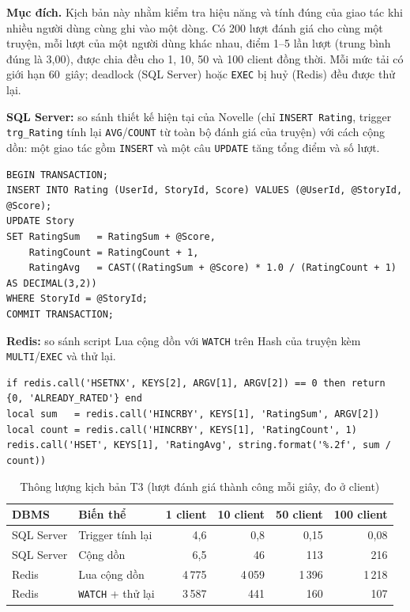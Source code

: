 \textbf{Mục đích.} Kịch bản này nhằm kiểm tra hiệu năng và tính đúng của giao tác khi nhiều người dùng cùng ghi vào một dòng. Có 200 lượt đánh giá cho cùng một truyện, mỗi lượt của một người dùng khác nhau, điểm 1--5 lần lượt (trung bình đúng là 3,00), được chia đều cho 1, 10, 50 và 100 client đồng thời. Mỗi mức tải có giới hạn 60~giây; deadlock (SQL Server) hoặc \texttt{EXEC} bị huỷ (Redis) đều được thử lại.

\textbf{SQL Server:} so sánh thiết kế hiện tại của Novelle (chỉ \texttt{INSERT Rating}, trigger \texttt{trg\_Rating} tính lại \texttt{AVG}/\texttt{COUNT} từ toàn bộ đánh giá của truyện) với cách cộng dồn: một giao tác gồm \texttt{INSERT} và một câu \texttt{UPDATE} tăng tổng điểm và số lượt.

\begin{verbatim}
BEGIN TRANSACTION;
INSERT INTO Rating (UserId, StoryId, Score) VALUES (@UserId, @StoryId, @Score);
UPDATE Story
SET RatingSum   = RatingSum + @Score,
    RatingCount = RatingCount + 1,
    RatingAvg   = CAST((RatingSum + @Score) * 1.0 / (RatingCount + 1) AS DECIMAL(3,2))
WHERE StoryId = @StoryId;
COMMIT TRANSACTION;
\end{verbatim}

\textbf{Redis:} so sánh script Lua cộng dồn với \texttt{WATCH} trên Hash của truyện kèm \texttt{MULTI}/\texttt{EXEC} và thử lại.

\begin{verbatim}
if redis.call('HSETNX', KEYS[2], ARGV[1], ARGV[2]) == 0 then return {0, 'ALREADY_RATED'} end
local sum   = redis.call('HINCRBY', KEYS[1], 'RatingSum', ARGV[2])
local count = redis.call('HINCRBY', KEYS[1], 'RatingCount', 1)
redis.call('HSET', KEYS[1], 'RatingAvg', string.format('%.2f', sum / count))
\end{verbatim}

\begin{table}[H]
\centering\small
\begin{tabular}{|l|l|r|r|r|r|}
\hline
\textbf{DBMS} & \textbf{Biến thể} & \textbf{1 client} & \textbf{10 client} & \textbf{50 client} & \textbf{100 client} \\ \hline
SQL Server & Trigger tính lại & 4,6 & 0,8 & 0,15 & 0,08 \\ \hline
SQL Server & Cộng dồn & 6,5 & 46 & 113 & 216 \\ \hline
Redis & Lua cộng dồn & 4\,775 & 4\,059 & 1\,396 & 1\,218 \\ \hline
Redis & \texttt{WATCH} + thử lại & 3\,587 & 441 & 160 & 107 \\ \hline
\end{tabular}
\caption{Thông lượng kịch bản T3 (lượt đánh giá thành công mỗi giây, đo ở client)}
\label{tab:tx-t3-throughput}
\end{table}

